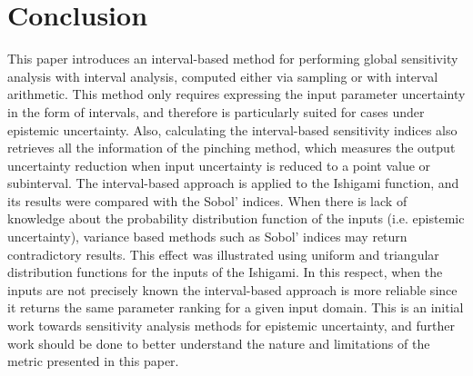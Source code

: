 \documentclass[twocolumn]{rps-esrel2022}
\begin{document}

\section{Conclusion}

This paper introduces an interval-based method for performing global sensitivity analysis with interval analysis, computed either
via sampling or with interval arithmetic.
This method only requires expressing the input parameter uncertainty in the form of intervals, and therefore is particularly
suited for cases under epistemic uncertainty.
Also, calculating the interval-based sensitivity indices also retrieves all the information of the pinching method,
which measures the output uncertainty reduction when input uncertainty is reduced to a point value or subinterval.
The interval-based approach is applied to the Ishigami function, and its results were compared with the Sobol' indices.
When there is lack of knowledge about the probability distribution function of the inputs (i.e. epistemic uncertainty), variance
based methods such as Sobol' indices may return contradictory results.
This effect was illustrated using uniform and triangular distribution functions for the inputs of the Ishigami.
In this respect, when the inputs are not precisely known the interval-based approach is more reliable since it returns the same
parameter ranking for a given input domain.
This is an initial work towards sensitivity analysis methods for epistemic uncertainty, and further work should be done to better
understand the nature and limitations of the metric presented in this paper.
\end{document}
